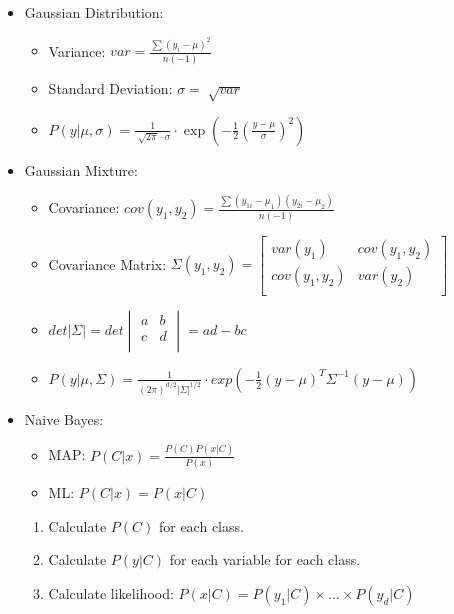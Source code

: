 \documentclass[twocolumn, 10pt]{article}
\begin{document}
\begin{itemize}[leftmargin=*, itemsep=0pt]
    \item Gaussian Distribution:
    \begin{itemize}[topsep=0pt]
        \item Variance: $\displaystyle var=\frac{\sum(y_i-\mu)^2}{n(-1)}$
        \item Standard Deviation: $\displaystyle \sigma=\sqrt[]{var}$
        \item $\displaystyle  P(y|\mu,\sigma)=\frac{1}{\sqrt[]{2\pi}\cdot\sigma}\cdot\exp\left(-\frac{1}{2}\left(\frac{y-\mu}{\sigma}\right)^2\right)$
    \end{itemize}

    \item Gaussian Mixture:
    \begin{itemize}[topsep=0pt]
        \item Covariance: $\displaystyle cov(y_1,y_2)=\frac{\sum(y_{1i}-\mu_1)(y_{2i}-\mu_2)}{n(-1)}$
        \item Covariance Matrix: $\Sigma(y_1,y_2)=
        \begin{bmatrix}
            var(y_1) & cov(y_1,y_2) \\
            cov(y_1,y_2) & var(y_2) \\
        \end{bmatrix}$
        \item $det\left\lvert\Sigma\right\rvert=det
        \begin{vmatrix}
            a & b \\
            c & d \\
        \end{vmatrix}
        = ad-bc$
        \item $\displaystyle P(y|\mu,\Sigma)=\frac{1}{(2\pi)^{d/2}|\Sigma|^{1/2}}\cdot exp\left(-\frac{1}{2}(y-\mu)^T\Sigma^{-1}(y-\mu)\right)$
    \end{itemize}

    \item Naive Bayes: 
    \begin{itemize}[topsep=0pt, itemsep=0pt]
        \item MAP: $\displaystyle P(C|x)=\frac{P(C)P(x|C)}{P(x)}$
        \item ML: $\displaystyle P(C|x)=P(x|C)$
    \end{itemize}
    \begin{enumerate}[topsep=0pt, itemsep=0pt]
        \item Calculate $P(C)$ for each class.
        \item Calculate $P(y|C)$ for each variable for each class.
        \item Calculate likelihood: $P(x|C)=P(y_1|C)\times\ldots\times P(y_d|C)$
    \end{enumerate}
    

\end{itemize}
\end{document}
